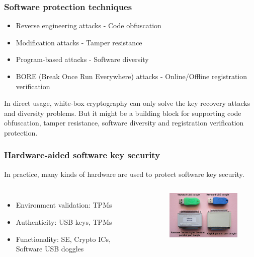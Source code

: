 \documentclass{beamer}
\begin{document}
\frame
{
\frametitle{Software protection techniques}
\begin{itemize}
\item \textcolor[rgb]{1.00, 0.00, 0.00}{Reverse engineering attacks} - \textcolor[rgb]{0.00,1.00,0.00}{Code obfuscation}

\item \textcolor[rgb]{1.00, 0.00, 0.00}{Modification attacks} - \textcolor[rgb]{0.00,1.00,0.00}{Tamper resistance}

\item \textcolor[rgb]{1.00, 0.00, 0.00}{Program-based attacks} - \textcolor[rgb]{0.00,1.00,0.00}{Software diversity}

\item \textcolor[rgb]{1.00, 0.00, 0.00}{BORE (Break Once Run Everywhere) attacks} - \textcolor[rgb]{0.00,1.00,0.00}{Online/Offline registration verification}
\end{itemize}

In direct usage, \textcolor[rgb]{1.00, 0.00, 0.00}{white-box cryptography} can only solve the key recovery attacks and diversity problems. But it might be a building
block for supporting code obfuscation, tamper resistance, software diversity and registration verification protection.
}

\frame
{
\frametitle{Hardware-aided software key security}
In practice, many kinds of hardware are used to protect software \textcolor[rgb]{1.00, 0.00, 0.00}{key security}.
\begin{columns}[c]
\begin{itemize}
\setlength{\itemsep}{12pt}
\item Environment validation: TPMs
\item Authenticity: USB keys, TPMs
\item Functionality: SE, Crypto ICs, Software USB doggles
\end{itemize}
\begin{figure}[htbp]
\centering
  \includegraphics[width=4.8cm]{./pics/dongles.jpg}
\end{figure}

\end{columns}
}
\end{document}
